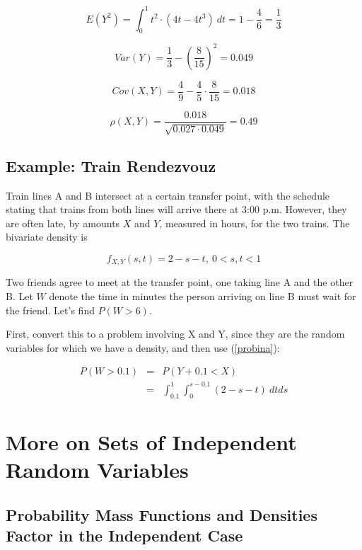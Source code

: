 \begin{equation}
E(Y^2) = \int_{0}^{1} t^2 \cdot (4t-4t^3) ~ dt  = 
1 - \frac{4}{6} = \frac{1}{3}
\end{equation}

\begin{equation}
Var(Y) =  \frac{1}{3} - \left (\frac{8}{15} \right )^2 = 0.049
\end{equation}

\begin{equation}
Cov(X,Y) = \frac{4}{9} - \frac{4}{5} \cdot \frac{8}{15} = 0.018
\end{equation}

\begin{equation}
\rho(X,Y) = \frac{0.018}{\sqrt{0.027 \cdot 0.049}} = 0.49
\end{equation}

\subsection{Example:  Train Rendezvouz}

Train lines A and B intersect at a certain transfer point, with the
schedule stating that trains from both lines will arrive there at 3:00
p.m.  However, they are often late, by amounts $X$ and $Y$, measured in
hours, for the two trains.  The bivariate density is

\begin{equation}
f_{X,Y}(s,t) = 2 - s -t, ~ 0 < s,t < 1
\end{equation}

Two friends agree to meet at the transfer point, one taking line A and
the other B.  Let $W$ denote the time in minutes the person arriving on
line B must wait for the friend.  Let's find $P(W > 6)$.

First, convert this to a problem involving X and Y, since they are the
random variables for which we have a density, and then use (\ref{probina}):

\begin{eqnarray}
P(W > 0.1) &=& P(Y + 0.1 < X ) \\
&=& \int_{0.1}^{1}   
\int_{0}^{s-0.1} (2-s-t) ~ dt ds
\end{eqnarray}

\section{More on Sets of Independent Random Variables}

\subsection{Probability Mass Functions and Densities Factor in the
Independent Case}
\label{theyfactor}

